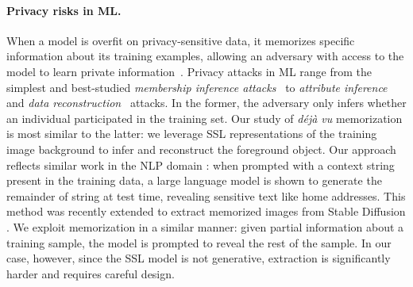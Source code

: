 \paragraph{Privacy risks in ML.} When a model is overfit on privacy-sensitive data, it memorizes specific information about its training examples, allowing an adversary with access to the model to learn private information~\citep{yeom2018privacy, feldman2020does}. Privacy attacks in ML range from the simplest and best-studied \emph{membership inference attacks}~\citep{shokri2017membership, salem2018ml, sablayrolles2019white} to \emph{attribute inference}~\citep{fredrikson2014privacy, mehnaz2022your, jayaraman2022attribute} and \emph{data reconstruction}~\citep{carlini2021extracting, balle2022reconstructing, guo2022bounding} attacks. In the former, the adversary only infers whether an individual participated in the training set. Our study of \emph{déjà vu} memorization is most similar to the latter: we leverage SSL representations of the training image background to infer and reconstruct the foreground object. Our approach reflects similar work in the NLP domain \citep{carlini2019secret, carlini2021extracting}: when prompted with a context string present in the training data, a large language model is shown to generate the remainder of string at test time, revealing sensitive text like home addresses. This method was recently extended to extract memorized images from Stable Diffusion \citep{google_diffusion}.  We exploit memorization in a similar manner: given partial information about a training sample, the model is prompted to reveal the rest of the sample. In our case, however, since the SSL model is not generative, extraction is significantly harder and requires careful design.

